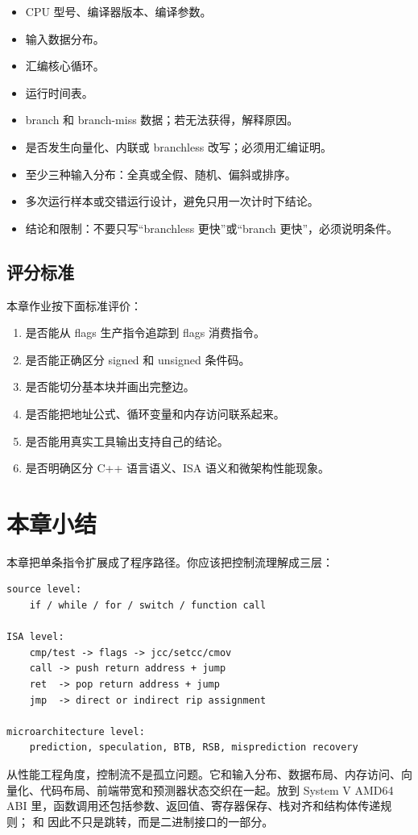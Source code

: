 \begin{exercisebox}
\begin{itemize}
  \item CPU 型号、编译器版本、编译参数。
  \item 输入数据分布。
  \item 汇编核心循环。
  \item 运行时间表。
  \item branch 和 branch-miss 数据；若无法获得，解释原因。
  \item 是否发生向量化、内联或 branchless 改写；必须用汇编证明。
  \item 至少三种输入分布：全真或全假、随机、偏斜或排序。
  \item 多次运行样本或交错运行设计，避免只用一次计时下结论。
  \item 结论和限制：不要只写“branchless 更快”或“branch 更快”，必须说明条件。
\end{itemize}

\subsection*{评分标准}

本章作业按下面标准评价：

\begin{enumerate}
  \item 是否能从 flags 生产指令追踪到 flags 消费指令。
  \item 是否能正确区分 signed 和 unsigned 条件码。
  \item 是否能切分基本块并画出完整边。
  \item 是否能把地址公式、循环变量和内存访问联系起来。
  \item 是否能用真实工具输出支持自己的结论。
  \item 是否明确区分 C++ 语言语义、ISA 语义和微架构性能现象。
\end{enumerate}
\end{exercisebox}

\section{本章小结}

本章把单条指令扩展成了程序路径。你应该把控制流理解成三层：

\begin{lstlisting}
source level:
    if / while / for / switch / function call

ISA level:
    cmp/test -> flags -> jcc/setcc/cmov
    call -> push return address + jump
    ret  -> pop return address + jump
    jmp  -> direct or indirect rip assignment

microarchitecture level:
    prediction, speculation, BTB, RSB, misprediction recovery
\end{lstlisting}

从性能工程角度，控制流不是孤立问题。它和输入分布、数据布局、内存访问、向量化、代码布局、前端带宽和预测器状态交织在一起。放到 System V AMD64 ABI 里，函数调用还包括参数、返回值、寄存器保存、栈对齐和结构体传递规则； 和  因此不只是跳转，而是二进制接口的一部分。
